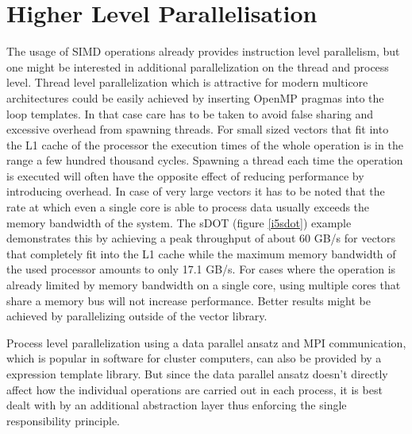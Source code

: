 \documentclass[12pt]{article}
\begin{document}
\section{Higher Level Parallelisation}
The usage of SIMD operations already provides instruction level parallelism, but
one might be interested in additional parallelization on the thread and process level.
Thread level parallelization which is attractive for modern multicore architectures
could be easily achieved by inserting OpenMP pragmas into the loop templates. In
that case care has to be taken to avoid false sharing and excessive overhead from
spawning threads. For small sized vectors that fit into the L1 cache of the processor
the execution times of the whole operation is in the range a few hundred thousand cycles.
Spawning a thread each time the operation is executed will often have the 
opposite effect of reducing performance by introducing overhead. In case of very
large vectors it has to be noted that the rate at which even a single core is
able to process data usually exceeds the memory bandwidth of the system. The
sDOT (figure \ref{i5sdot}) example demonstrates this by achieving a peak throughput of about 60 GB/s
for vectors that completely fit into the L1 cache while the maximum memory bandwidth
of the used processor amounts to only 17.1 GB/s. For cases where the operation
is already limited by memory bandwidth on a single core, using multiple cores
that share a memory bus will not increase performance. Better results might
be achieved by parallelizing outside of the vector library.

Process level parallelization using a data parallel ansatz and MPI communication,
which is popular in software for cluster computers, can also be provided by a 
expression template library. But since the data parallel ansatz doesn't directly
affect how the individual operations are carried out in each process, it is best
dealt with by an additional abstraction layer thus enforcing the single
responsibility principle.
\end{document}
